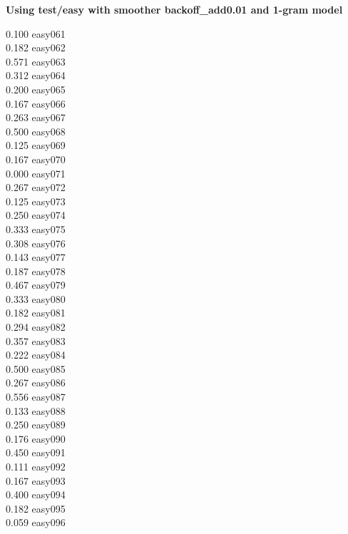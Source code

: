 \documentclass[10pt]{article}
\begin{document}
\begin{enumerate}
\begin{enumerate}
            \textbf{Using test/easy with smoother backoff\_add0.01 and 1-gram model}
            \begin{multicols}{5}
            0.100 easy061\\
            0.182 easy062\\
            0.571 easy063\\
            0.312 easy064\\
            0.200 easy065\\
            0.167 easy066\\
            0.263 easy067\\
            0.500 easy068\\
            0.125 easy069\\
            0.167 easy070\\
            0.000 easy071\\
            0.267 easy072\\
            0.125 easy073\\
            0.250 easy074\\
            0.333 easy075\\
            0.308 easy076\\
            0.143 easy077\\
            0.187 easy078\\
            0.467 easy079\\
            0.333 easy080\\
            0.182 easy081\\
            0.294 easy082\\
            0.357 easy083\\
            0.222 easy084\\
            0.500 easy085\\
            0.267 easy086\\
            0.556 easy087\\
            0.133 easy088\\
            0.250 easy089\\
            0.176 easy090\\
            0.450 easy091\\
            0.111 easy092\\
            0.167 easy093\\
            0.400 easy094\\
            0.182 easy095\\
            0.059 easy096\\

\end{multicols}
\end{enumerate}
\end{enumerate}
\end{document}

